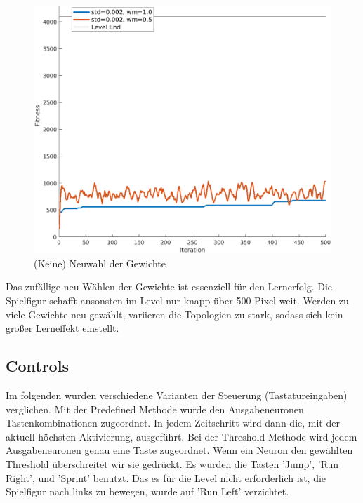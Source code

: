 \documentclass{hbrs-ecta-report}
\begin{document}
\begin{figure}[h!]
	\centering
	\includegraphics[width=\linewidth]{img/learningRates2.png}
	\caption{(Keine) Neuwahl der Gewichte}
	\label{fig:learningRates2} 
\end{figure}

Das zufällige neu Wählen der Gewichte ist essenziell für den Lernerfolg. Die Spielfigur schafft ansonsten im Level nur knapp über 500 Pixel weit. Werden zu viele Gewichte neu gewählt, variieren die Topologien zu stark, sodass sich kein großer Lerneffekt einstellt.

\subsection{Controls}
Im folgenden wurden verschiedene Varianten der Steuerung (Tastatureingaben) verglichen.
Mit der Predefined Methode wurde den Ausgabeneuronen Tastenkombinationen zugeordnet. In jedem Zeitschritt wird dann die, mit der aktuell höchsten Aktivierung, ausgeführt.
Bei der Threshold Methode wird jedem Ausgabeneuronen genau eine Taste zugeordnet. Wenn ein Neuron den gewählten Threshold überschreitet wir sie gedrückt. \newline
Es wurden die Tasten 'Jump', 'Run Right', und 'Sprint' benutzt. Das es für die Level nicht erforderlich ist, die Spielfigur nach links zu bewegen, wurde auf 'Run Left' verzichtet. \newline
\end{document}
